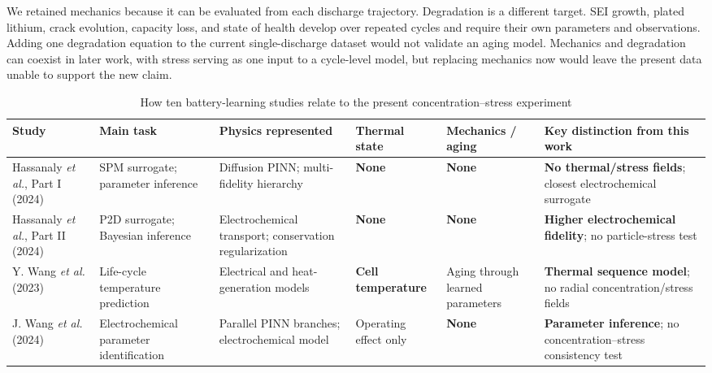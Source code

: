 \documentclass[conference]{IEEEtran}
\begin{document}
We retained mechanics because it can be evaluated from each discharge trajectory. Degradation is a different target. SEI growth, plated lithium, crack evolution, capacity loss, and state of health develop over repeated cycles and require their own parameters and observations. Adding one degradation equation to the current single-discharge dataset would not validate an aging model. Mechanics and degradation can coexist in later work, with stress serving as one input to a cycle-level model, but replacing mechanics now would leave the present data unable to support the new claim.

\begin{table}[t]
\centering
\caption{How ten battery-learning studies relate to the present concentration--stress experiment}
\label{tab:gap}
\scriptsize
\renewcommand{\arraystretch}{1.08}
\setlength{\tabcolsep}{2.5pt}
\begin{tabular}{>{\raggedright\arraybackslash}p{2.55cm}>{\raggedright\arraybackslash}p{2.55cm}>{\raggedright\arraybackslash}p{3.0cm}>{\raggedright\arraybackslash}p{1.65cm}>{\raggedright\arraybackslash}p{2.35cm}>{\raggedright\arraybackslash}p{3.7cm}}
\toprule
Study & Main task & Physics represented & Thermal state & Mechanics / aging & Key distinction from this work \\
\midrule
Hassanaly \emph{et al.}, Part I (2024) \cite{hassanaly2024part1} & SPM surrogate; parameter inference & Diffusion PINN; multi-fidelity hierarchy & \textbf{None} & \textbf{None} & \textbf{No thermal/stress fields}; closest electrochemical surrogate \\
\addlinespace[1pt]
Hassanaly \emph{et al.}, Part II (2024) \cite{hassanaly2024part2} & P2D surrogate; Bayesian inference & Electrochemical transport; conservation regularization & \textbf{None} & \textbf{None} & \textbf{Higher electrochemical fidelity}; no particle-stress test \\
\addlinespace[1pt]
Y. Wang \emph{et al.} (2023) \cite{wang2023temperature} & Life-cycle temperature prediction & Electrical and heat-generation models & \textbf{Cell temperature} & Aging through learned parameters & \textbf{Thermal sequence model}; no radial concentration/stress fields \\
\addlinespace[1pt]
J. Wang \emph{et al.} (2024) \cite{wang2024parameter} & Electrochemical parameter identification & Parallel PINN branches; electrochemical model & Operating effect only & \textbf{None} & \textbf{Parameter inference}; no concentration--stress consistency test \\

\end{tabular}
\end{table}
\end{document}
